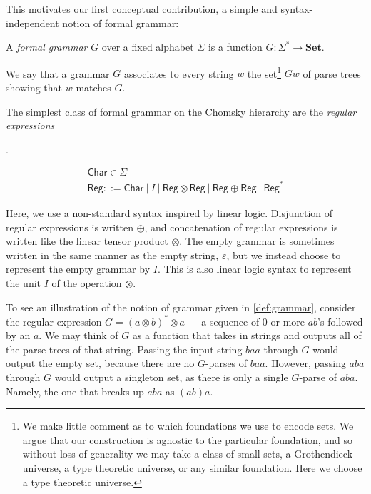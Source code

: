 \documentclass[acmsmall,screen,nonacm]{acmart}
\newcommand{\String}{\Sigma^{*}}
\newcommand{\Set}{\mathbf{Set}}
\newif\ifdraft
\renewcommand{\max}[1]{\ifdraft{\color{blue}[{\bf Max says}: #1]}\fi}
\begin{document}
This motivates our first conceptual contribution, a simple and
syntax-independent notion of formal grammar:

\begin{definition}
  \label{def:grammar}
  A \emph{formal grammar} $G$ over a fixed alphabet $\Sigma$ is a function
  $G : \String \to \Set$.
\end{definition}

We say that a grammar $G$ associates to every string $w$ the set\footnote{We
  make little comment as to which foundations we use to encode sets. We argue\max{drop ``We argue''}
  that our construction is agnostic to the particular foundation, and so without
  loss of generality\max{incorrect use of ``without loss of generality''} we may take a class of small sets, a Grothendieck universe,
  a type theoretic universe, or any similar foundation. Here we choose a type
  theoretic universe.} $G w$ of parse
trees showing that $w$ matches $G$.

The simplest class of formal grammar on the Chomsky\max{first mention of Chomsky hierarchy, why not bring it up earlier when you are describing what a grammar is? Also cite}
hierarchy are the \emph{regular expressions}

\max{inaccurate reflection of common terminology. These are regular expressions,
  regular grammars usually means a CFG with a restriction on recursion that
  ensures you only allow Kleene star.}.

\begin{gather*}
  \mathsf{Char} \in \Sigma \\
  \mathsf{Reg} ::= \mathsf{Char}~|~I~|~\mathsf{Reg} \otimes \mathsf{Reg}~|~\mathsf{Reg} \oplus \mathsf{Reg}~|~\mathsf{Reg}^{*}
\end{gather*}

Here, we use a non-standard syntax inspired by linear logic. Disjunction of
regular expressions is written $\oplus$, and concatenation of regular
expressions is written like the linear tensor product $\otimes$. The
empty grammar is sometimes written in the same manner as the empty string,
$\varepsilon$, but we instead choose to represent the empty grammar by $I$. This
is also linear logic syntax to represent the unit $I$ of the operation $\otimes$.

To see an illustration of the notion of grammar given in \cref{def:grammar}, consider the regular expression
$G = (a \otimes b)^{*} \otimes a$ --- a sequence of 0 or more $ab$'s followed by
an $a$. We may think of $G$ as a function that takes in strings and outputs all
of the parse trees of that string. Passing the input string $baa$ through $G$
would output the empty set, because there are no $G$-parses of $baa$. However,
passing $aba$ through $G$ would output a singleton set, as there is only a
single $G$-parse of $aba$. Namely, the one that breaks up $aba$ as $(ab)a$.
\end{document}
